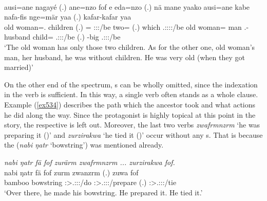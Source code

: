 \begin{exe}
	\\
	\gll ausi=ane nagayé (.) ane=nzo fof e eda=nzo (.) nä mane yaako ausi=ane kabe nafa-fis nge=mär yaa (.) kafar-kafar yaa\\
	{old woman=\Poss.\Sg} children (.) \Dem=\Only{} \Emph{} \Stdu:\Sbj:\Nonpast:\Ipfv/be two=\Only{} (.) \Indf{} which \Tsg.\Masc:\Sbj:\Pst:\Ipfv:\Andat/be {old woman=\Poss} man \Third.\Poss-husband child=\Priv{} \Tsg.\Masc:\Sbj:\Pst:\Ipfv/be (.) \Redup-big \Tsg.\Masc:\Sbj:\Pst:\Ipfv/be\\
	\trans `The old woman has only those two children. As for the other one, old woman's man, her husband, he was without children. He was very old (when they got married)'
	\label{ex529}
\end{exe}

On the other end of the spectrum, s can be wholly omitted, since the indexation in the verb is sufficient. In this way, a single verb often stands as a whole clause. Example (\ref{ex534}) describes the path which the ancestor took and what actions he did along the way. Since the protagonist is highly topical at this point in the story, the respective  is left out. Moreover, the last two verbs \emph{zwafrmnzrm} `he was preparing it (\F)' and \emph{zurzirakwa} `he tied it (\F)' occur without any s. That is because the   (\emph{nabi ŋatr} `bowstring') was mentioned already.

\begin{exe}
	\ex \emph{nabi ŋatr fä fof zurärm zwafrmnzrm ... zurzirakwa fof.}\\
	\gll nabi ŋatr fä fof zurm zwanzrm (.) zuwa fof\\
	bamboo bowstring \Dist{} \Emph{} \Sg:\Sbj>\Tsg.\F:\Obj:\Pst:\Dur/do \Sg:\Sbj>\Tsg.\F:\Obj:\Pst:\Dur/prepare (.) \Sg:\Sbj>\Tsg.\F:\Obj:\Pst:\Ipfv/tie \Emph{}\\
	\trans `Over there, he made his bowstring. He prepared it. He tied it.'\\
	\label{ex534}
\end{exe}

